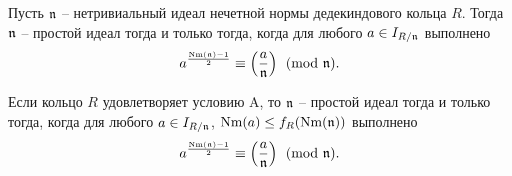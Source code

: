 \documentclass[_00_dissertation.tex]{subfiles}
\begin{document}
\begin{theorem}\label{theorem:euler_criteria}
    Пусть $\mathfrak{n}$ -- нетривиальный идеал нечетной нормы дедекиндового кольца $R$.
    Тогда $\mathfrak{n}$ -- простой идеал тогда и только тогда, когда для любого $a \in I_{R/\mathfrak{n}}$ выполнено
    \begin{equation*}
        a^{\frac{\textrm{Nm}(\mathfrak{n}) - 1}{2}} \equiv \left(\frac{a}{\mathfrak{n}}\right) \pmod{\mathfrak{n}}.
    \end{equation*}

    Если кольцо $R$ удовлетворяет условию A, то $\mathfrak{n}$ -- простой идеал тогда и только тогда, когда для любого $a \in I_{R/\mathfrak{n}}$, $\textrm{Nm}(a) \le f_R(\textrm{Nm}(\mathfrak{n}))$ выполнено
    \begin{equation*}
        a^{\frac{\textrm{Nm}(\mathfrak{n}) - 1}{2}} \equiv \left(\frac{a}{\mathfrak{n}}\right) \pmod{\mathfrak{n}}.
    \end{equation*}
\end{theorem}
\end{document}
